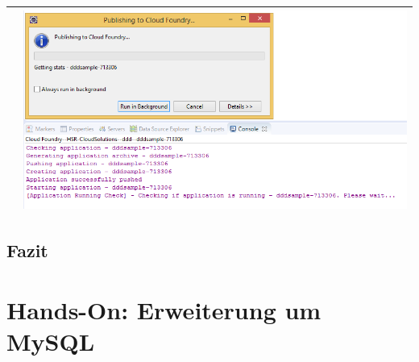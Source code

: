 \begin{longtable}{| p{5cm} | p{11cm} |}
 \\ \hline
&\includegraphics[width=0.65\columnwidth, valign=T]{images/ddd_cloud_deployment/7.png}
 \\ \hline
\end{longtable}
\section{Fazit}





\chapter{Hands-On: Erweiterung um MySQL}
